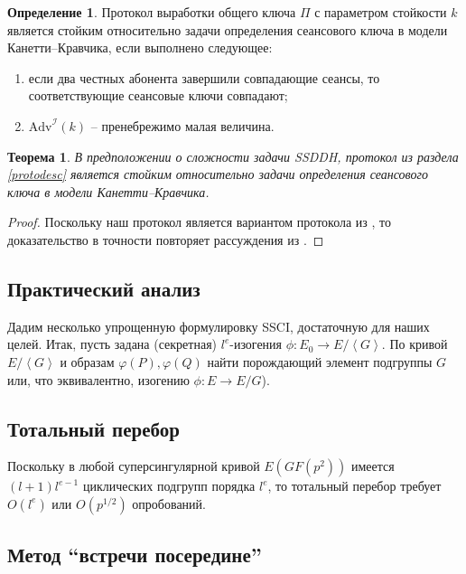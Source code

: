 \documentclass[a4paper,12pt]{article}
\newcommand{\tr}[1]{\left\langle #1\right\rangle}
\newtheorem{theorem}{Теорема}
\theoremstyle{definition}
\newtheorem{definition}{Определение}
\begin{document}
\begin{definition}
 Протокол выработки общего ключа $\Pi$ с параметром стойкости $k$ является стойким относительно задачи определения сеансового ключа в модели Канетти--Кравчика, если выполнено следующее:
 \begin{enumerate} 
  \item если два честных абонента завершили совпадающие сеансы, то соответствующие сеансовые ключи совпадают; 
  \item $\mathrm{Adv}^{\mathcal{I}}(k)$ -- пренебрежимо малая величина.
 \end{enumerate}

\end{definition}

\begin{theorem} В предположении о сложности задачи SSDDH, протокол из раздела \ref{protodesc} является стойким относительно задачи определения сеансового ключа в модели Канетти--Кравчика.
 \end{theorem}
\begin{proof}
 Поскольку наш протокол является вариантом протокола из \cite{DF}, то доказательство в точности повторяет рассуждения из \cite[Theorem 6.1]{DF}.
\end{proof}



\subsection{Практический анализ}

Дадим несколько упрощенную формулировку SSCI, достаточную для наших целей. Итак, пусть задана (секретная) $l^e$-изогения $\phi:E_0\to E/\tr{G}$. По кривой $E/\tr{G}$ и образам $\varphi (P), \varphi(Q)$
найти порождающий элемент  подгруппы $ G$ или, что эквивалентно, изогению $\phi:E\to E/G$).
 
 \subsection*{Тотальный перебор}
  
Поскольку в любой суперсингулярной кривой $E (GF(p^2))$ имеется $(l+1)l^{e-1}$ циклических подгрупп порядка $l^e$, то тотальный перебор требует $O(l^e) $ или $O(p^{1/2})$ опробований.
 
 \subsection*{Метод ``встречи посередине''}
\end{document}
